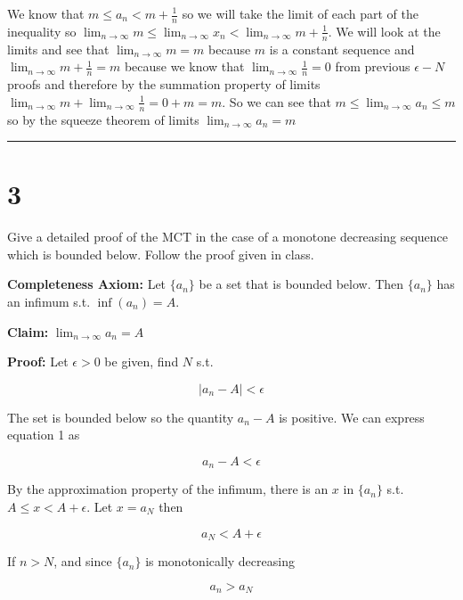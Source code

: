 \documentclass[10pt,letterpaper]{article}
\newcommand\ds{\displaystyle}
\newcommand\qedsym{\hfill \rule{2mm}{2mm}}
\begin{document}
We know that $m \leq a_n < m + \frac{1}{n}$ so we will take the limit of each part of the inequality so $\ds\lim_{n\to\infty}m \leq \ds\lim_{n\to\infty}x_n < \ds\lim_{n\to\infty}m + \frac{1}{n}$. We will look at the limits and see that $\ds\lim_{n\to\infty}m = m$ because $m$ is a constant sequence and $\ds\lim_{n\to\infty}m+\frac{1}{n} = m$ because we know that $\ds\lim_{n\to\infty}\frac{1}{n} = 0$ from previous $\epsilon - N$ proofs and therefore by the summation property of limits $\ds\lim_{n\to\infty}m + \ds\lim_{n\to\infty}\frac{1}{n} = 0 + m = m$. So we can see that $m \leq \ds\lim_{n\to\infty}a_n \leq m$ so by the squeeze theorem of limits $\ds\lim_{n\to\infty} a_n = m$ \qedsym{}

\section*{3} Give a detailed proof of the MCT in the case of a monotone decreasing sequence which is bounded below. Follow the proof given in class.

\medskip

\textbf{Completeness Axiom:} Let $\{a_n\}$ be a set that is bounded below. Then $\{a_n\}$ has an infimum s.t. $\inf(a_n) = A$.

\medskip

\textbf{Claim:} $\ds\lim_{n\to\infty}a_n = A$

\medskip

\textbf{Proof:} Let $\epsilon > 0$ be given, find $N$ s.t.

\begin{equation}
  |a_n - A| < \epsilon
\end{equation}

The set is bounded below so the quantity $a_n - A$ is positive. We can express equation 1 as

\begin{equation}
  a_n - A < \epsilon
\end{equation}

By the approximation property of the infimum, there is an $x$ in $\{a_n\}$ s.t. $A \leq x < A + \epsilon$. Let $x = a_N$ then

\begin{equation}
  a_N < A + \epsilon
\end{equation}

If $n > N$, and since $\{a_n\}$ is monotonically decreasing

\begin{equation}
  a_n > a_N
\end{equation}
\end{document}
